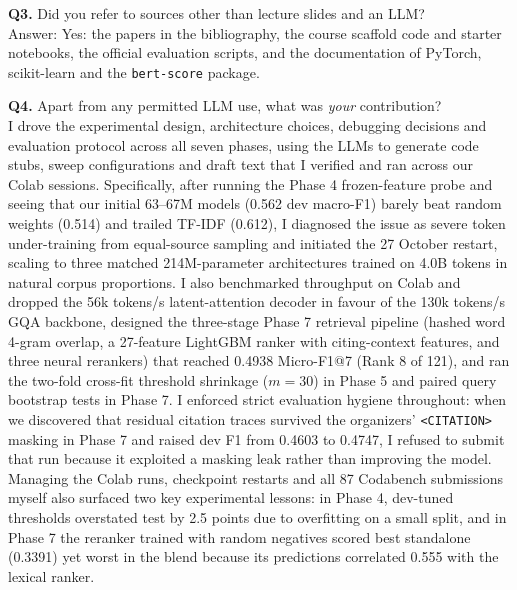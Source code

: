 \documentclass[11pt, oneside]{article}
\begin{document}
\noindent
\textbf{Q3.} Did you refer to sources other than lecture slides and an LLM? \\[0.4em]
Answer: Yes: the papers in the bibliography, the course scaffold code and starter notebooks, the official evaluation scripts, and the documentation of PyTorch, scikit-learn and the \texttt{bert-score} package.
\medskip

\noindent
\textbf{Q4.} Apart from any permitted LLM use, what was \emph{your} contribution? \\[0.4em]
I drove the experimental design, architecture choices, debugging decisions and evaluation protocol across all seven phases, using the LLMs to generate code stubs, sweep configurations and draft text that I verified and ran across our Colab sessions. Specifically, after running the Phase 4 frozen-feature probe and seeing that our initial 63--67M models (0.562 dev macro-F1) barely beat random weights (0.514) and trailed TF-IDF (0.612), I diagnosed the issue as severe token under-training from equal-source sampling and initiated the 27 October restart, scaling to three matched 214M-parameter architectures trained on 4.0B tokens in natural corpus proportions. I also benchmarked throughput on Colab and dropped the 56k tokens/s latent-attention decoder in favour of the 130k tokens/s GQA backbone, designed the three-stage Phase 7 retrieval pipeline (hashed word 4-gram overlap, a 27-feature LightGBM ranker with citing-context features, and three neural rerankers) that reached 0.4938 Micro-F1@7 (Rank 8 of 121), and ran the two-fold cross-fit threshold shrinkage ($m=30$) in Phase 5 and paired query bootstrap tests in Phase 7. I enforced strict evaluation hygiene throughout: when we discovered that residual citation traces survived the organizers' \texttt{<CITATION>} masking in Phase 7 and raised dev F1 from 0.4603 to 0.4747, I refused to submit that run because it exploited a masking leak rather than improving the model. Managing the Colab runs, checkpoint restarts and all 87 Codabench submissions myself also surfaced two key experimental lessons: in Phase 4, dev-tuned thresholds overstated test by 2.5 points due to overfitting on a small split, and in Phase 7 the reranker trained with random negatives scored best standalone (0.3391) yet worst in the blend because its predictions correlated 0.555 with the lexical ranker.

\vspace{1em}


\end{document}
